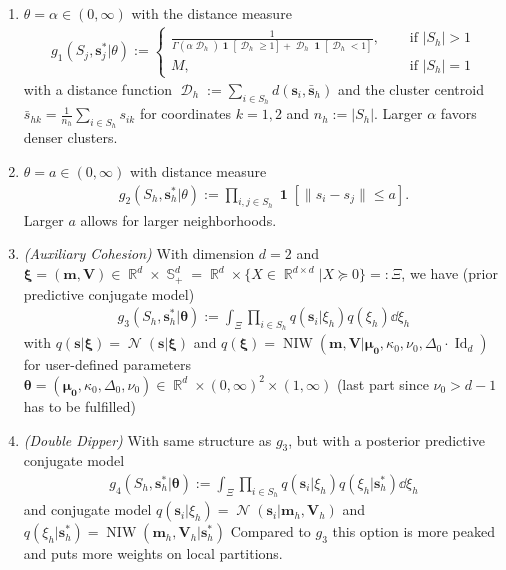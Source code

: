 \documentclass[12pt,a4paper]{article}
\DeclareMathOperator{\Normal}{\mathcal{N}}
\DeclareMathOperator{\DD}{\mathcal{D}}
\DeclareMathOperator{\indicator}{\pmb{1}}
\DeclareMathOperator{\NormInvWish}{\mathrm{NIW}}
\DeclareMathOperator{\RR}{\mathbb{R}}
\DeclareMathOperator{\Identity}{\mathrm{Id}}
\DeclareMathOperator{\PosSemDef}{\mathbb{S}}
\begin{document}
\begin{enumerate}
    \item $\theta = \alpha \in (0,\infty)$ with the distance measure
    \begin{align*}
        g_1(S_j, \pmb{s}_j^* \vert \theta) := \begin{cases}
            \frac{1}{\Gamma(\alpha \DD_h) \indicator[\DD_h \geq 1] + \DD_h \indicator[\DD_h < 1]}, &\quad \text{ if } \vert S_h \vert > 1\\
            M, &\quad \text{ if } \vert S_h \vert = 1
        \end{cases}
    \end{align*}
    with a distance function $\DD_h := \sum_{i \in S_h} d(\pmb{s}_i, \bar{\pmb{s}}_h)$ and the cluster centroid
    $\bar{s}_{hk} = \frac{1}{n_h} \sum_{i\in S_h} s_{ik}$ for coordinates $k=1,2$ and $n_h := \vert S_h \vert$. Larger $\alpha$ favors denser clusters.  \medskip
    
    \item $\theta = a \in (0, \infty)$ with distance measure
    \begin{align*}
        g_2(S_h, \pmb{s}_h^* \vert \theta) := \prod_{i, j \in S_h} \indicator\left[\lVert s_i - s_j\rVert \leq a \right].
    \end{align*}
    Larger $a$ allows for larger neighborhoods. \medskip
    
    \item  \textit{(Auxiliary Cohesion)} With dimension $d=2$ and
    $\pmb{\xi} = (\pmb{m}, \pmb{V}) \in \RR^d \times \PosSemDef_+^d = \RR^d \times \{X \in \RR^{d\times d} \vert X \succeq 0\} =: \Xi$, we have (prior predictive conjugate model)
    \begin{align*}
        g_3(S_h, \pmb{s}_h^* \vert \pmb{\theta}) := \int_{\Xi} \prod_{i \in S_h} q(\pmb{s}_i \vert \xi_h) q(\xi_h) \dd \xi_h
    \end{align*}
    with $q(\pmb{s}\vert \pmb{\xi}) = \Normal(\pmb{s}\vert \pmb{\xi})$ and $q(\pmb{\xi}) = \NormInvWish(\pmb{m}, \pmb{V} \vert \pmb{\mu_0}, \kappa_0, \nu_0, \Delta_0 \cdot \Identity_d)$
    for user-defined parameters 
    $\pmb{\theta} = \left(\pmb{\mu_0}, \kappa_0, \Delta_0, \nu_0\right) \in \RR^d \times (0, \infty)^2 \times (1, 
    \infty)$ (last part since $\nu_0 > d -1$ has to be fulfilled) \medskip
    
    \item \textit{(Double Dipper)} With same structure as $g_3$, but with a posterior predictive conjugate model
    \begin{align*}
        g_4(S_h, \pmb{s}_h^* \vert \pmb{\theta}) := \int_{\Xi} \prod_{i \in S_h} q(\pmb{s}_i \vert 
        \xi_h) q(\xi_h\vert \pmb{s}_h^*) \dd \xi_h
    \end{align*}
    and conjugate model $q(\pmb{s}_i \vert 
        \xi_h) = \Normal(\pmb{s}_i \vert \pmb{m}_h, \pmb{V}_h)$ and $q(\xi_h\vert \pmb{s}_h^*) = 
        \NormInvWish(\pmb{m}_h, \pmb{V}_h \vert \pmb{s}_h^*)$
    Compared to $g_3$ this option is more peaked and puts more weights on local partitions.
\end{enumerate}
\end{document}
